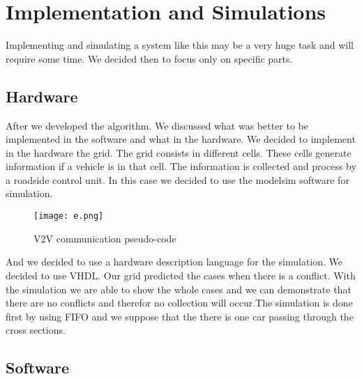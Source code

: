 \documentclass[conference]{IEEEtran}
\begin{document}
\section{Implementation and Simulations }
Implementing and simulating a system like this may be a very huge task and will require some time. We decided then to focus only on specific parts.  


\subsection{Hardware}

After we developed the algorithm. We discussed what was better to be implemented in the software and what in the hardware. We decided to implement in the hardware the grid. The grid consists in different cells. These cells generate information if a vehicle is in that cell. The information is collected and process by a roadside control unit. In this case we decided to use the modelsim software for simulation.
\begin{figure}[htp]
    \centering
     \texttt{[image: e.png]}
    \caption{V2V communication pseudo-code }
    \label{fig:reg-gen}
\end{figure}

And we decided to use a hardware description language for the simulation. We decided to use VHDL. Our grid predicted the cases when there is a conflict. With the simulation we are able to show the whole cases and we can demonstrate that there are no conflicts and therefor no collection will occur.The simulation is done first by using FIFO and we suppose that the there is one car passing through the cross sections.


\subsection{Software}
\end{document}
